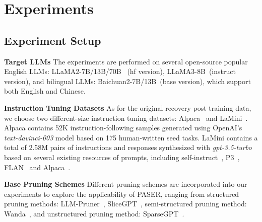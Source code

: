 \section{Experiments}
\subsection{Experiment Setup}
\textbf{Target LLMs} The experiments are performed on several open-source popular English LLMs: LLaMA2-7B/13B/70B~\citep{touvron2023llama} (hf version),  LLaMA3-8B~\citep{dubey2024llama}(instruct version), and bilingual LLMs: Baichuan2-7B/13B~\citep{yang2023baichuan}(base version), which support both English and Chinese.

\textbf{Instruction Tuning Datasets} As for the original recovery post-training data, we choose two different-size instruction tuning datasets: Alpaca~\citep{alpaca2023} and LaMini~\citep{wu2024lamini}. Alpaca contains 52K instruction-following samples generated using OpenAI's \textit{text-davinci-003} model based on 175 human-written seed tasks. LaMini contains a total of 2.58M pairs of instructions and responses synthesized with \textit{gpt-3.5-turbo} based on several existing resources of prompts, including self-instruct~\citep{wang2023self}, P3~\citep{sanh2022multitask}, FLAN~\citep{longpre2023flan} and Alpaca~\citep{alpaca2023}.

\textbf{Base Pruning Schemes} Different pruning schemes are incorporated into our experiments to explore the applicability of PASER, ranging from structured pruning methods: LLM-Pruner~\citep{ma2023llm}, SliceGPT~\citep{slidegpt2024saleh}, semi-structured pruning method: Wanda~\citep{wanda2024mingjie}, and unstructured pruning method: SparseGPT~\citep{sparsegpt2023elias}.

